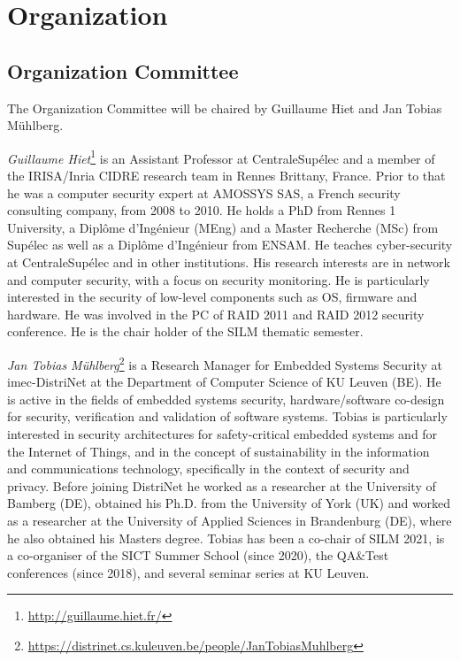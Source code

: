 \documentclass[a4paper,11pt]{article} %
\numberwithin{equation}{section} %
\numberwithin{figure}{section} %
\numberwithin{table}{section} %
\begin{document}

\section{Organization}

\subsection{Organization Committee}

The Organization Committee will be chaired by Guillaume Hiet and Jan Tobias
M\"uhlberg.

\emph{Guillaume Hiet}\footnote{\url{http://guillaume.hiet.fr/}} is an
Assistant Professor at CentraleSupélec and a member of the IRISA/Inria
CIDRE research team in Rennes Brittany, France. Prior to that he was a
computer security expert at AMOSSYS SAS, a French security consulting
company, from 2008 to 2010. He holds a PhD from Rennes 1 University, a
Diplôme d'Ingénieur (MEng) and a Master Recherche (MSc) from Supélec as
well as a Diplôme d'Ingénieur from ENSAM. He teaches cyber-security at
CentraleSupélec and in other institutions. His research interests are in
network and computer security, with a focus on security monitoring. He is
particularly interested in the security of low-level components such as OS,
firmware and hardware. He was involved in the PC of RAID 2011 and RAID 2012
security conference. He is the chair holder of the SILM thematic semester.

\emph{Jan Tobias
M\"uhlberg}\footnote{\url{https://distrinet.cs.kuleuven.be/people/JanTobiasMuhlberg}}
is a Research Manager for Embedded Systems Security at imec-DistriNet at
the Department of Computer Science of KU Leuven (BE). He is active in the
fields of embedded systems security, hardware/software co-design for
security, verification and validation of software systems. Tobias is
particularly interested in security architectures for safety-critical
embedded systems and for the Internet of Things, and in the concept of
sustainability in the information and communications technology,
specifically in the context of security and privacy. Before joining
DistriNet he worked as a researcher at the University of Bamberg (DE),
obtained his Ph.D. from the University of York (UK) and worked as a
researcher at the University of Applied Sciences in Brandenburg (DE), where
he also obtained his Masters degree. Tobias has been a co-chair of SILM
2021, is a co-organiser of the SICT Summer School (since 2020), the
QA\&Test conferences (since 2018), and several seminar series at KU Leuven.
\end{document}
